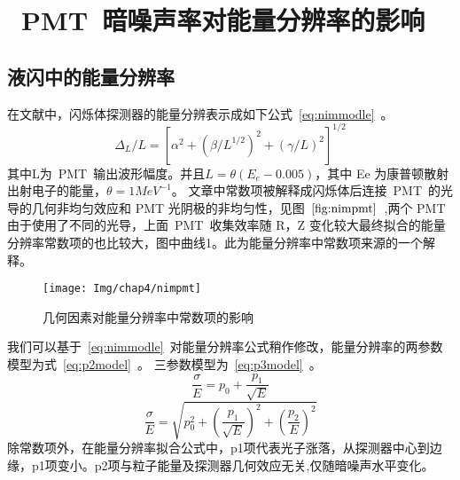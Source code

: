 \section{~PMT~暗噪声率对能量分辨率的影响}
\subsection{液闪中的能量分辨率}
在文献\citep{scholermann1980optimizing}中，闪烁体探测器的能量分辨表示成如下公式~\ref{eq:nimmodle}~。
\begin{equation}\label{eq:nimmodle}
\Delta_L /L = [ \alpha^2 + (\beta/L^{1/2})^2+(\gamma/L)^2]^{1/2}
\end{equation}
其中L为~PMT~输出波形幅度。并且$L=\theta(E_e-0.005)$，其中 Ee 为康普顿散射出射电子的能量，$\theta=1 MeV^{-1}$。 文章中常数项被解释成闪烁体后连接~PMT~的光导的几何非均匀效应和 PMT 光阴极的非均匀性，见图~$\ref{fig:nimpmt}$~,两个 PMT 由于使用了不同的光导，上面~PMT~收集效率随 R，Z 变化较大最终拟合的能量分辨率常数项的也比较大，图中曲线1。此为能量分辨率中常数项来源的一个解释。
 \begin{figure}[!htbp]
  \centering
   \texttt{[image: Img/chap4/nimpmt]}
    \caption{几何因素对能量分辨率中常数项的影响}
  \label{fig:nimpmt}
\end{figure}
我们可以基于~\ref{eq:nimmodle}~对能量分辨率公式稍作修改，能量分辨率的两参数模型为式~\ref{eq:p2model}~。
三参数模型为~\ref{eq:p3model}~。
\begin{equation}\label{eq:p2model}
 \frac{\sigma}{E}=p_0+\frac{p_1}{\sqrt{E}}
\end{equation}
\begin{equation}\label{eq:p3model}
  \frac{\sigma}{E}=\sqrt{p_0^2+{(\frac{p_1}{\sqrt{E}})}^2+{(\frac{p_2}{E})}^2}
\end{equation}
除常数项外，在能量分辨率拟合公式中，p1项代表光子涨落，从探测器中心到边缘，p1项变小。p2项与粒子能量及探测器几何效应无关,仅随暗噪声水平变化。
